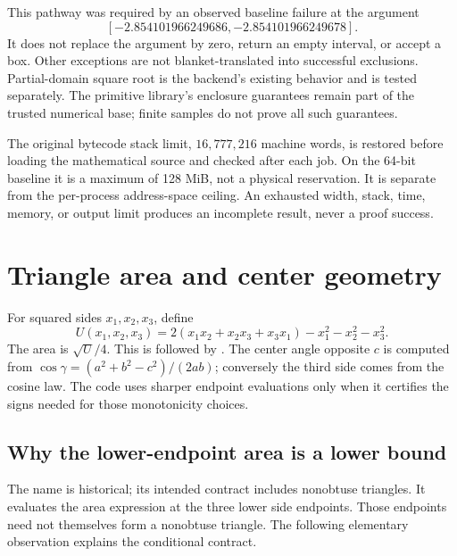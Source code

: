 \documentclass[11pt,a4paper]{article}
\newcommand{\code}[1]{\texttt{\detokenize{#1}}}
\theoremstyle{remark}\newtheorem*{contract}{Implementation contract}\newtheorem*{auditnote}{Audit note}
\begin{document}


This pathway was required by an observed baseline failure at the argument
\[[-2.854101966249686,-2.854101966249678].\]
It does not replace the argument by
zero, return an empty interval, or accept a box. Other exceptions are not
blanket-translated into successful exclusions. Partial-domain square root is
the backend's existing behavior and is tested separately. The primitive
library's enclosure guarantees remain part of the trusted numerical base;
finite samples do not prove all such guarantees.

The original bytecode stack limit, $16{,}777{,}216$ machine words, is restored
before loading the mathematical source and checked after each job. On the
64-bit baseline it is a maximum of 128 MiB, not a physical reservation. It is
separate from the per-process address-space ceiling. An exhausted width,
stack, time, memory, or output limit produces an incomplete result, never a
proof success.

\section{Triangle area and center geometry}

For squared sides $x_1,x_2,x_3$, define
\[
U(x_1,x_2,x_3)=2(x_1x_2+x_2x_3+x_3x_1)-x_1^2-x_2^2-x_3^2.
\]
The area is $\sqrt{U}/4$. This is \code{ups_I} followed by
\code{area_I}. The center angle opposite $c$ is computed from
$\cos\gamma=(a^2+b^2-c^2)/(2ab)$; conversely the third side comes from
the cosine law. The code uses sharper endpoint evaluations only when it
certifies the signs needed for those monotonicity choices.



\subsection{Why the lower-endpoint area is a lower bound}
The name \code{areamin_acute} is historical; its intended contract includes
nonobtuse triangles. It evaluates the area expression at the three lower side
endpoints. Those endpoints need not themselves form a nonobtuse triangle.
The following elementary observation explains the conditional contract.
\end{document}
